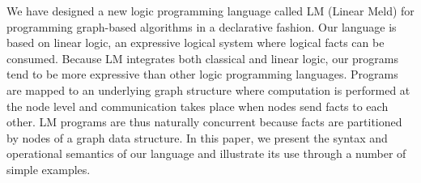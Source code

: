 We have designed a new logic programming language called LM (Linear Meld)
for programming graph-based algorithms in a declarative fashion. Our language
is based on linear logic, an expressive logical system where logical facts can
be consumed. Because LM integrates both classical and linear logic, our programs
tend to be more expressive than other logic programming languages. Programs are
mapped to an underlying graph structure where computation is performed at the node
level and communication takes place when nodes send facts to each other. LM programs
are thus naturally concurrent because facts are partitioned by nodes of a graph data
structure. In this paper, we present the syntax and operational semantics of our language
and illustrate its use through a number of simple examples.
